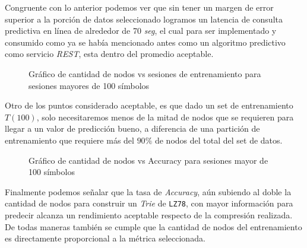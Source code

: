 	Congruente con lo anterior podemos ver que sin tener un margen de error superior a la porción de datos seleccionado logramos un latencia de consulta predictiva en línea de alrededor de 70 \emph{seg}, el cual para ser implementado y consumido como ya se había mencionado antes como un algoritmo predictivo como servicio \emph{REST}, esta dentro del promedio aceptable.

	\begin{figure}[h] 
		\centering
		\caption{Gráfico de cantidad de nodos vs sesiones de entrenamiento para sesiones mayores de 100 símbolos}
	  \label{fig:sim}
	\end{figure}


	Otro de los puntos  considerado aceptable, es que dado un set de entrenamiento $T(100)$, solo necesitaremos menos de la mitad de nodos que se requieren para llegar a un valor de predicción bueno, a diferencia de una partición de entrenamiento que requiere más del $90\%$ de nodos del total del set de datos.\\
	

	
	\begin{figure}[h] 
		\centering
			\caption{Gráfico de cantidad de nodos vs Accuracy para sesiones mayor de 100 símbolos}
		\label{fig:sim}
	\end{figure}



	Finalmente podemos señalar que la tasa de \emph{Accuracy}, aún  subiendo al doble la cantidad de nodos para construir un \emph{Trie} de \texttt{LZ78}, con mayor información  para predecir alcanza un rendimiento aceptable respecto de la compresión realizada. De todas maneras también se cumple que la cantidad de nodos del entrenamiento es directamente proporcional a la métrica seleccionada.